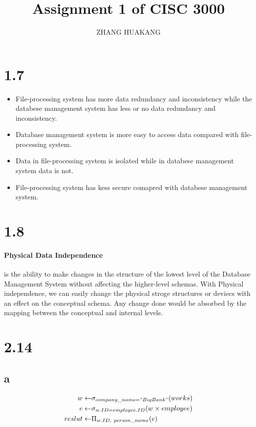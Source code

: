 \documentclass{article}
\title{Assignment 1 of CISC 3000}
\author{ZHANG HUAKANG}
\begin{document}
    \maketitle
    \section*{1.7}
    \paragraph{}
    \begin{itemize}
        \item File-processing system has more data redundancy and inconsistency while the databese management system has less or no data redundancy and inconsistency.
        \item Database management system is more easy to access data compared with file-processing system.
        \item Data in file-processing system is isolated while in databese management system data is not.
        \item File-processing system has kess secure comapred with databese management system.
    \end{itemize}
    \section*{1.8}
    \paragraph{Physical Data Independence}is the ability to make changes in the structure of the lowest level of the Database Management System without affecting the higher-level schemas. With Physical independence, we can easily change the physical stroge structures or deviecs with an effect on the conceptual schema. Any change done would be absorbed by the mapping between the conceptual and internal levels.
    \section*{2.14}
    \subsection*{a} 
    \begin{equation*}
        \begin{split}
            w\leftarrow&\sigma_{company\_name="BigBank"}(works)\\
            e\leftarrow&\sigma_{w.ID=employee.ID}(w\times employee)\\
            reslut\leftarrow&\Pi_{w.ID,\ person\_ name}(e)
        \end{split}
    \end{equation*}
    
\end{document}
